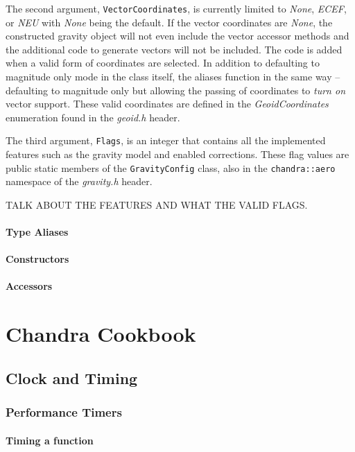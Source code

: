 \documentclass[10pt,letterpaper]{memoir} %
\begin{document}
The second argument, \texttt{VectorCoordinates}, is currently limited to \emph{None}, \emph{ECEF}, or \emph{NEU} with \emph{None} being the default.  If the vector coordinates are \emph{None}, the constructed gravity object will not even include the vector accessor methods and the additional code to generate vectors will not be included.  The code is added when a valid form of coordinates are selected.  In addition to defaulting to magnitude only mode in the class itself, the aliases function in the same way -- defaulting to magnitude only but allowing the passing of coordinates to \emph{turn on} vector support.  These valid coordinates are defined in the \emph{GeoidCoordinates} enumeration found in the \emph{geoid.h} header.

The third argument, \texttt{Flags}, is an integer that contains all the implemented features such as the gravity model and enabled corrections.  These flag values are public static members of the \texttt{GravityConfig} class, also in the \texttt{chandra::aero} namespace of the \emph{gravity.h} header.   

TALK ABOUT THE FEATURES AND WHAT THE VALID FLAGS.

\subsection{Type Aliases}

\subsection{Constructors}

\subsection{Accessors}



\part{Chandra Cookbook}
\chapter{Clock and Timing}
\section{Performance Timers}
\subsection{Timing a function}
\end{document}
